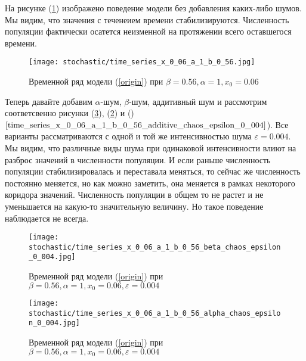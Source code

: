         На рисунке (\ref{time_series_x_0_06_a_1_b_0_56}) изображено поведение модели без добавления каких-либо шумов. Мы видим, что значения с теченеием времени стабилизируются. Численность популяции фактически осатется неизменной на протяжении всего оставшегося времени.

        \begin{figure}
            \centering
            \texttt{[image: stochastic/time\_series\_x\_0\_06\_a\_1\_b\_0\_56.jpg]}

            \captionsetup{justification=centering}
            \caption{Временной ряд модели (\ref{origin}) при \(\beta = 0.56, \alpha = 1, x_0 = 0.06\)}
            \label{time_series_x_0_06_a_1_b_0_56}
        \end{figure}

        Теперь давайте добавим \(\alpha\)-шум, \(\beta\)-шум, аддитивный шум и рассмотрим соответсвенно рисунки (\ref{time_series_x_0_06_a_1_b_0_56_alpha_chaos_epsilon_0_004}), (\ref{time_series_x_0_06_a_1_b_0_56_beta_chaos_epsilon_0_004}) и ()\(\ref{time_series_x_0_06_a_1_b_0_56_additive_chaos_epsilon_0_004}\)). Все варианты рассматриваются с одной и той же интенсивностью шума \(\varepsilon = 0.004\). Мы видим, что различные виды шума при одинаковой интенсивности влиют на разброс значений в численности популяции. И если раньше численность популяции стабилизировалась и переставала меняться, то сейчас же численность постоянно меняется, но как можно заметить, она меняется в рамках некоторого коридора значений. Численность популяции в общем то не растет и не уменьшается на какую-то значительную величину. Но такое поведение наблюдается не всегда.

        \begin{figure}
            \centering
            \texttt{[image: stochastic/time\_series\_x\_0\_06\_a\_1\_b\_0\_56\_beta\_chaos\_epsilon\_0\_004.jpg]}
        
            \captionsetup{justification=centering}
            \caption{Временной ряд модели (\ref{origin}) при \(\beta = 0.56, \alpha = 1, x_0 = 0.06, \varepsilon = 0.004\)}
            \label{time_series_x_0_06_a_1_b_0_56_beta_chaos_epsilon_0_004}
        \end{figure}

        \begin{figure}
            \centering
            \texttt{[image: stochastic/time\_series\_x\_0\_06\_a\_1\_b\_0\_56\_alpha\_chaos\_epsilon\_0\_004.jpg]}
        
            \captionsetup{justification=centering}
            \caption{Временной ряд модели (\ref{origin}) при \(\beta = 0.56, \alpha = 1, x_0 = 0.06, \varepsilon = 0.004\)}
            \label{time_series_x_0_06_a_1_b_0_56_alpha_chaos_epsilon_0_004}
        \end{figure}

